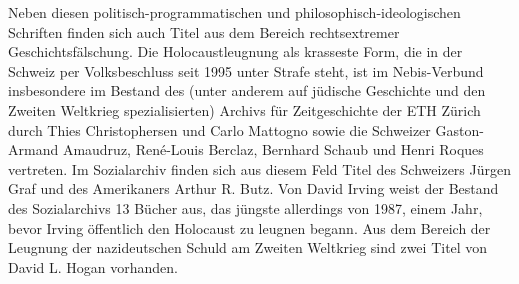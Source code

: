 \documentclass[a4paper,
fontsize=11pt,
oneside,
numbers=noperiodatend,
parskip=half-,
bibliography=totoc,
final
]{scrartcl}
\begin{document}
Neben diesen politisch-programmatischen und philosophisch-ideologischen
Schriften finden sich auch Titel aus dem Bereich rechtsextremer
Geschichtsfälschung. Die Holocaustleugnung als krasseste Form, die in
der Schweiz per Volksbeschluss seit 1995 unter Strafe steht, ist im
Nebis-Verbund insbesondere im Bestand des (unter anderem auf jüdische
Geschichte und den Zweiten Weltkrieg spezialisierten) Archivs für
Zeitgeschichte der ETH Zürich durch Thies Christophersen und Carlo
Mattogno sowie die Schweizer Gaston-Armand Amaudruz, René-Louis Berclaz,
Bernhard Schaub und Henri Roques vertreten. Im Sozialarchiv finden sich
aus diesem Feld Titel des Schweizers Jürgen Graf und des Amerikaners
Arthur R. Butz. Von David Irving weist der Bestand des Sozialarchivs 13
Bücher aus, das jüngste allerdings von 1987, einem Jahr, bevor Irving
öffentlich den Holocaust zu leugnen begann. Aus dem Bereich der Leugnung
der nazideutschen Schuld am Zweiten Weltkrieg sind zwei Titel von David
L. Hogan vorhanden.
\end{document}
